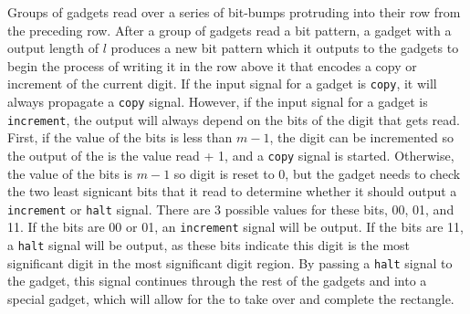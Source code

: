 \subsubsection{\cread}
%
Groups of {\cread} gadgets read over a series of bit-bumps protruding into their row from the preceding row.
%
After a group of {\cread} gadgets read a bit pattern, a {\cread} gadget with a output length of $l$ produces a new bit pattern which it outputs to the {\prewarp} gadgets to begin the process of writing it in the row above it that encodes a copy or increment of the current digit.
%
If the input signal for a {\cread} gadget is {\tt copy}, it will always propagate a {\tt copy} signal.
%
However, if the input signal for a {\cread} gadget is {\tt increment}, the output will always depend on the bits of the digit that gets read.
%
First, if the value of the bits is less than $m - 1$, the digit can be incremented so the output of the {\cread} is the value read + 1, and a {\tt copy} signal is started.
%
Otherwise, the value of the bits is $m - 1$ so digit is reset to 0, but the {\cread} gadget needs to check the two least signicant bits that it read to determine whether it should output a {\tt increment} or {\tt halt} signal.
%
There are 3 possible values for these bits, 00, 01, and 11.
%
If the bits are 00 or 01, an {\tt increment} signal will be output.
%
If the bits are 11, a {\tt halt} signal will be output, as these bits indicate this digit is the most significant digit in the most significant digit region.
%
By passing a {\tt halt} signal to the {\prewarp} gadget, this signal continues through the rest of the {\warpunit} gadgets and into a special {\cwrite} gadget, which will allow for the {\roofunit} to take over and complete the rectangle.
%
